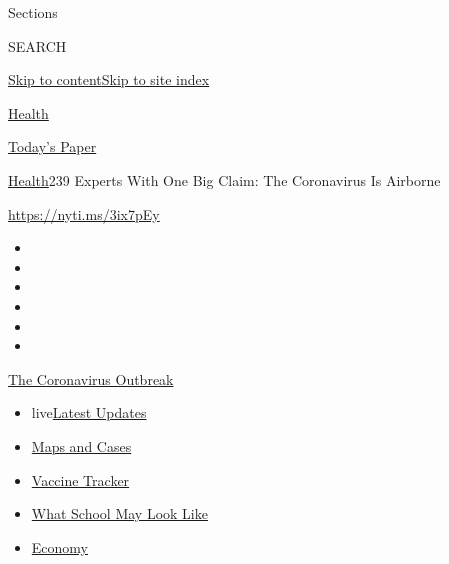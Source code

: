 Sections

SEARCH

\protect\hyperlink{site-content}{Skip to
content}\protect\hyperlink{site-index}{Skip to site index}

\href{https://www.nytimes.com/section/health}{Health}

\href{https://myaccount.nytimes.com/auth/login?response_type=cookie\&client_id=vi}{}

\href{https://www.nytimes.com/section/todayspaper}{Today's Paper}

\href{/section/health}{Health}\textbar{}239 Experts With One Big Claim:
The Coronavirus Is Airborne

\url{https://nyti.ms/3ix7pEy}

\begin{itemize}
\item
\item
\item
\item
\item
\item
\end{itemize}

\href{https://www.nytimes.com/news-event/coronavirus?action=click\&pgtype=Article\&state=default\&region=TOP_BANNER\&context=storylines_menu}{The
Coronavirus Outbreak}

\begin{itemize}
\tightlist
\item
  live\href{https://www.nytimes.com/2020/08/01/world/coronavirus-covid-19.html?action=click\&pgtype=Article\&state=default\&region=TOP_BANNER\&context=storylines_menu}{Latest
  Updates}
\item
  \href{https://www.nytimes.com/interactive/2020/us/coronavirus-us-cases.html?action=click\&pgtype=Article\&state=default\&region=TOP_BANNER\&context=storylines_menu}{Maps
  and Cases}
\item
  \href{https://www.nytimes.com/interactive/2020/science/coronavirus-vaccine-tracker.html?action=click\&pgtype=Article\&state=default\&region=TOP_BANNER\&context=storylines_menu}{Vaccine
  Tracker}
\item
  \href{https://www.nytimes.com/interactive/2020/07/29/us/schools-reopening-coronavirus.html?action=click\&pgtype=Article\&state=default\&region=TOP_BANNER\&context=storylines_menu}{What
  School May Look Like}
\item
  \href{https://www.nytimes.com/live/2020/07/31/business/stock-market-today-coronavirus?action=click\&pgtype=Article\&state=default\&region=TOP_BANNER\&context=storylines_menu}{Economy}
\end{itemize}

